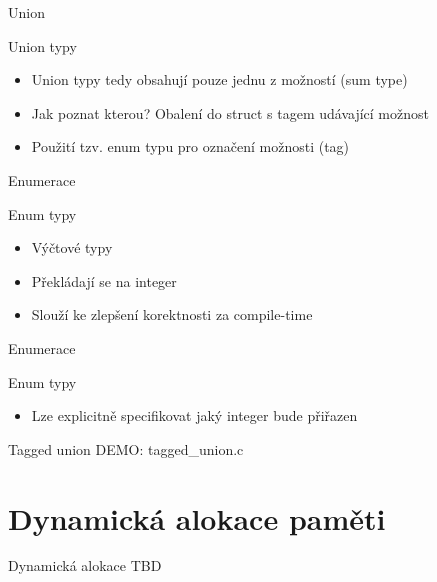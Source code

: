 \documentclass[9pt]{beamer}
\begin{document}
\begin{frame}{Union}
    \begin{block}{Union typy}
        \begin{itemize}
            \item Union typy tedy obsahují pouze jednu z možností (sum type)
            \item Jak poznat kterou? Obalení do struct s tagem udávající možnost
            \item Použití tzv. enum typu pro označení možnosti (tag)
        \end{itemize}
    \end{block}
\end{frame}

\begin{frame}{Enumerace}
    \begin{block}{Enum typy}
        \begin{itemize}
            \item Výčtové typy
            \item Překládají se na integer
            \item Slouží ke zlepšení korektnosti za compile-time
        \end{itemize}
    \end{block}
    
\end{frame}

\begin{frame}{Enumerace}
    \begin{block}{Enum typy}
        \begin{itemize}
            \item Lze explicitně specifikovat jaký integer bude přiřazen
        \end{itemize}
    \end{block}
    
\end{frame}

\begin{frame}{Tagged union}
    DEMO: tagged\_union.c
\end{frame}

\section{Dynamická alokace paměti}

\begin{frame}{Dynamická alokace}
    TBD
\end{frame}
\end{document}
